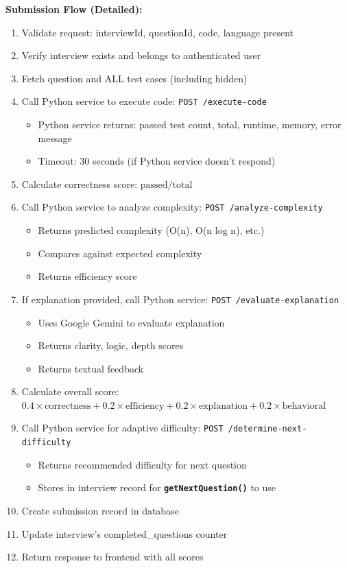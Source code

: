 \documentclass[12pt,a4paper,oneside]{article}
\newcommand{\funcname}[1]{\texttt{\textbf{#1}}}
\begin{document}
\textbf{Submission Flow (Detailed):}

\begin{enumerate}
    \item Validate request: interviewId, questionId, code, language present
    \item Verify interview exists and belongs to authenticated user
    \item Fetch question and ALL test cases (including hidden)
    \item Call Python service to execute code: \texttt{POST /execute-code}
    \begin{itemize}
        \item Python service returns: passed test count, total, runtime, memory, error message
        \item Timeout: 30 seconds (if Python service doesn't respond)
    \end{itemize}
    \item Calculate correctness score: \( \text{passed} / \text{total} \)
    \item Call Python service to analyze complexity: \texttt{POST /analyze-complexity}
    \begin{itemize}
        \item Returns predicted complexity (O(n), O(n log n), etc.)
        \item Compares against expected complexity
        \item Returns efficiency score
    \end{itemize}
    \item If explanation provided, call Python service: \texttt{POST /evaluate-explanation}
    \begin{itemize}
        \item Uses Google Gemini to evaluate explanation
        \item Returns clarity, logic, depth scores
        \item Returns textual feedback
    \end{itemize}
    \item Calculate overall score: \( 0.4 \times \text{correctness} + 0.2 \times \text{efficiency} + 0.2 \times \text{explanation} + 0.2 \times \text{behavioral} \)
    \item Call Python service for adaptive difficulty: \texttt{POST /determine-next-difficulty}
    \begin{itemize}
        \item Returns recommended difficulty for next question
        \item Stores in interview record for \funcname{getNextQuestion()} to use
    \end{itemize}
    \item Create submission record in database
    \item Update interview's completed\_questions counter
    \item Return response to frontend with all scores
\end{enumerate}
\end{document}
